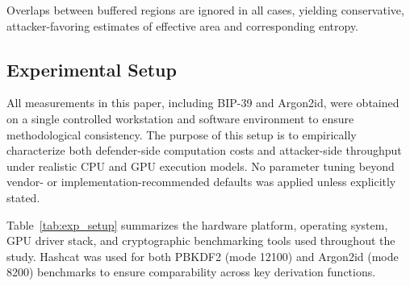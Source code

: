 \documentclass[mathematics,article,accept,pdftex,moreauthors]{Definitions/mdpi}
\begin{document}
Overlaps between buffered regions are ignored in all cases, yielding conservative, attacker-favoring estimates of effective area and corresponding entropy.


\subsection{Experimental Setup}
\label{sec:experimental_setup}

All measurements in this paper, including BIP-39 and Argon2id, were obtained on a single controlled workstation and software environment to ensure methodological consistency. The purpose of this setup is to empirically characterize both defender-side computation costs and attacker-side throughput under realistic CPU and GPU execution models. No parameter tuning beyond vendor- or implementation-recommended defaults was applied unless explicitly stated.

Table~\ref{tab:exp_setup} summarizes the hardware platform, operating system, GPU driver stack, and cryptographic benchmarking tools used throughout the study. Hashcat was used for both PBKDF2 (mode 12100) and Argon2id (mode 8200) benchmarks to ensure comparability across key derivation functions.
\end{document}
